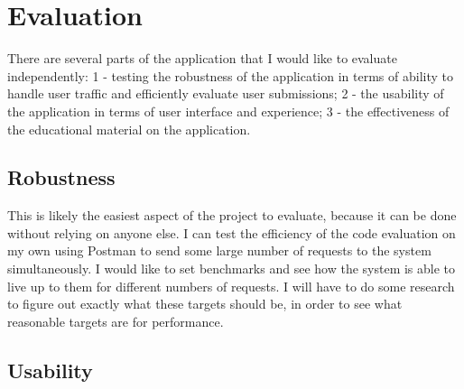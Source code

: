 \documentclass[10pt,twocolumn]{article}
\begin{document}
\section{Evaluation}



There are several parts of the application that I would like to evaluate independently: 1 - testing the robustness of 
the application in terms of ability to handle user traffic and efficiently evaluate user submissions; 2 - the usability 
of the application in terms of user interface and experience; 3 - the effectiveness of the educational material on the 
application.

\subsection{Robustness}

This is likely the easiest aspect of the project to evaluate, because it can be done without relying on anyone else. I 
can test the efficiency of the code evaluation on my own using Postman to send some large number of requests to the 
system simultaneously. I would like to set benchmarks and see how the system is able to live up to them for different 
numbers of requests. I will have to do some research to figure out exactly what these targets should be, in order to see
what reasonable targets are for performance.

\subsection{Usability}
\end{document}
